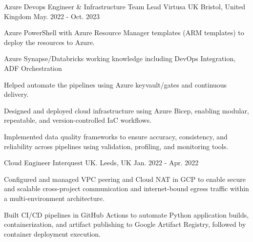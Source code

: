 \begin{cventries}
  \cventry
    {Azure Devops Engineer \& Infrastructure Team Lead} %
    {Virtusa UK} %
    {Bristol, United Kingdom} %
    {May. 2022 - Oct. 2023} %
    {
      \begin{cvitems} %
        \item {Azure PowerShell with Azure Resource Manager templates (ARM templates) to deploy the resources to Azure.}
        \item {Azure Synapse/Databricks working knowledge including DevOps Integration, ADF Orchestration}
        \item {Helped automate the pipelines using Azure keyvault/gates and continuous delivery.}
        \item {Designed and deployed cloud infrastructure using Azure Bicep, enabling modular, repeatable, and version-controlled IaC workflows.}
        \item {Implemented data quality frameworks to ensure accuracy, consistency, and reliability across pipelines using validation, profiling, and monitoring tools.}
      \end{cvitems}
    }

  \cventry
    {Cloud Engineer} %
    {Interquest UK.} %
    {Leeds, UK} %
    {Jan. 2022 - Apr. 2022} %
    {
      \begin{cvitems} %
        \item {Configured and managed VPC peering and Cloud NAT in GCP to enable secure and scalable cross-project communication and internet-bound egress traffic within a multi-environment architecture.}
        \item {Built CI/CD pipelines in GitHub Actions to automate Python application builds, containerization, and artifact publishing to Google Artifact Registry, followed by container deployment execution.}
      \end{cvitems}
    }


\end{cventries}
